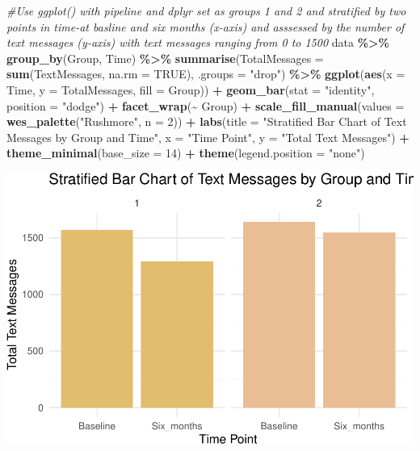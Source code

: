 \documentclass[
]{article}
\newenvironment{Shaded}{\begin{snugshade}}{\end{snugshade}}
\newcommand{\AttributeTok}[1]{\textcolor[rgb]{0.13,0.29,0.53}{#1}}
\newcommand{\CommentTok}[1]{\textcolor[rgb]{0.56,0.35,0.01}{\textit{#1}}}
\newcommand{\ConstantTok}[1]{\textcolor[rgb]{0.56,0.35,0.01}{#1}}
\newcommand{\DecValTok}[1]{\textcolor[rgb]{0.00,0.00,0.81}{#1}}
\newcommand{\FunctionTok}[1]{\textcolor[rgb]{0.13,0.29,0.53}{\textbf{#1}}}
\newcommand{\NormalTok}[1]{#1}
\newcommand{\SpecialCharTok}[1]{\textcolor[rgb]{0.81,0.36,0.00}{\textbf{#1}}}
\newcommand{\StringTok}[1]{\textcolor[rgb]{0.31,0.60,0.02}{#1}}
\begin{document}
\begin{Shaded}
\begin{Highlighting}[]
\CommentTok{\#Use ggplot() with pipeline and dplyr set as groups 1 and 2 and stratified by two points in time{-}at basline and six months (x{-}axis) and asssessed by the number of text messages (y{-}axis) with text messages ranging from 0 to 1500}
\NormalTok{data }\SpecialCharTok{\%\textgreater{}\%}
  \FunctionTok{group\_by}\NormalTok{(Group, Time) }\SpecialCharTok{\%\textgreater{}\%}
  \FunctionTok{summarise}\NormalTok{(}\AttributeTok{TotalMessages =} \FunctionTok{sum}\NormalTok{(TextMessages, }\AttributeTok{na.rm =} \ConstantTok{TRUE}\NormalTok{), }\AttributeTok{.groups =} \StringTok{"drop"}\NormalTok{) }\SpecialCharTok{\%\textgreater{}\%}
  \FunctionTok{ggplot}\NormalTok{(}\FunctionTok{aes}\NormalTok{(}\AttributeTok{x =}\NormalTok{ Time, }\AttributeTok{y =}\NormalTok{ TotalMessages, }\AttributeTok{fill =}\NormalTok{ Group)) }\SpecialCharTok{+}
  \FunctionTok{geom\_bar}\NormalTok{(}\AttributeTok{stat =} \StringTok{"identity"}\NormalTok{, }\AttributeTok{position =} \StringTok{"dodge"}\NormalTok{) }\SpecialCharTok{+}
  \FunctionTok{facet\_wrap}\NormalTok{(}\SpecialCharTok{\textasciitilde{}}\NormalTok{ Group) }\SpecialCharTok{+}
  \FunctionTok{scale\_fill\_manual}\NormalTok{(}\AttributeTok{values =} \FunctionTok{wes\_palette}\NormalTok{(}\StringTok{"Rushmore"}\NormalTok{, }\AttributeTok{n =} \DecValTok{2}\NormalTok{)) }\SpecialCharTok{+}
  \FunctionTok{labs}\NormalTok{(}\AttributeTok{title =} \StringTok{"Stratified Bar Chart of Text Messages by Group and Time"}\NormalTok{,}
       \AttributeTok{x =} \StringTok{"Time Point"}\NormalTok{,}
       \AttributeTok{y =} \StringTok{"Total Text Messages"}\NormalTok{) }\SpecialCharTok{+}
  \FunctionTok{theme\_minimal}\NormalTok{(}\AttributeTok{base\_size =} \DecValTok{14}\NormalTok{) }\SpecialCharTok{+}
  \FunctionTok{theme}\NormalTok{(}\AttributeTok{legend.position =} \StringTok{"none"}\NormalTok{)}
\end{Highlighting}
\end{Shaded}

\includegraphics{Assignment_3_Collaborating_in_Github_files/figure-latex/Bar Chart-1.pdf}
\end{document}
